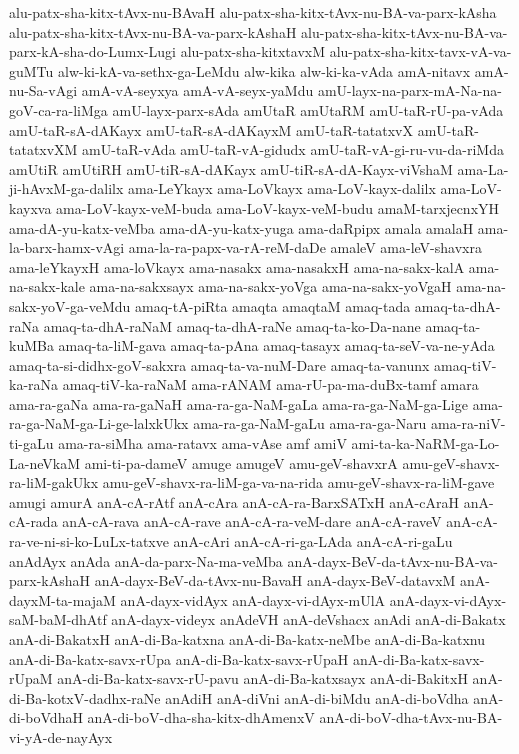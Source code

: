 {alu-patx-sha-kitx-tAvx-nu-BAvaH
alu-patx-sha-kitx-tAvx-nu-BA-va-parx-kAsha
alu-patx-sha-kitx-tAvx-nu-BA-va-parx-kAshaH
alu-patx-sha-kitx-tAvx-nu-BA-va-parx-kA-sha-do-Lumx-Lugi
alu-patx-sha-kitxtavxM
alu-patx-sha-kitx-tavx-vA-va-guMTu
alw-ki-kA-va-sethx-ga-LeMdu
alw-kika
alw-ki-ka-vAda
amA-nitavx
amA-nu-Sa-vAgi
amA-vA-seyxya
amA-vA-seyx-yaMdu
amU-layx-na-parx-mA-Na-na-goV-ca-ra-liMga
amU-layx-parx-sAda
amUtaR
amUtaRM
amU-taR-rU-pa-vAda
amU-taR-sA-dAKayx
amU-taR-sA-dAKayxM
amU-taR-tatatxvX
amU-taR-tatatxvXM
amU-taR-vAda
amU-taR-vA-gidudx
amU-taR-vA-gi-ru-vu-da-riMda
amUtiR
amUtiRH
amU-tiR-sA-dAKayx
amU-tiR-sA-dA-Kayx-viVshaM
ama-La-ji-hAvxM-ga-dalilx
ama-LeYkayx
ama-LoVkayx
ama-LoV-kayx-dalilx
ama-LoV-kayxva
ama-LoV-kayx-veM-buda
ama-LoV-kayx-veM-budu
amaM-tarxjecnxYH
ama-dA-yu-katx-veMba
ama-dA-yu-katx-yuga
ama-daRpipx
amala
amalaH
ama-la-barx-hamx-vAgi
ama-la-ra-papx-va-rA-reM-daDe
amaleV
ama-leV-shavxra
ama-leYkayxH
ama-loVkayx
ama-nasakx
ama-nasakxH
ama-na-sakx-kalA
ama-na-sakx-kale
ama-na-sakxsayx
ama-na-sakx-yoVga
ama-na-sakx-yoVgaH
ama-na-sakx-yoV-ga-veMdu
amaq-tA-piRta
amaqta
amaqtaM
amaq-tada
amaq-ta-dhA-raNa
amaq-ta-dhA-raNaM
amaq-ta-dhA-raNe
amaq-ta-ko-Da-nane
amaq-ta-kuMBa
amaq-ta-liM-gava
amaq-ta-pAna
amaq-tasayx
amaq-ta-seV-va-ne-yAda
amaq-ta-si-didhx-goV-sakxra
amaq-ta-va-nuM-Dare
amaq-ta-vanunx
amaq-tiV-ka-raNa
amaq-tiV-ka-raNaM
ama-rANAM
ama-rU-pa-ma-duBx-tamf
amara
ama-ra-gaNa
ama-ra-gaNaH
ama-ra-ga-NaM-gaLa
ama-ra-ga-NaM-ga-Lige
ama-ra-ga-NaM-ga-Li-ge-lalxkUkx
ama-ra-ga-NaM-gaLu
ama-ra-ga-Naru
ama-ra-niV-ti-gaLu
ama-ra-siMha
ama-ratavx
ama-vAse
amf
amiV
ami-ta-ka-NaRM-ga-Lo-La-neVkaM
ami-ti-pa-dameV
amuge
amugeV
amu-geV-shavxrA
amu-geV-shavx-ra-liM-gakUkx
amu-geV-shavx-ra-liM-ga-va-na-rida
amu-geV-shavx-ra-liM-gave
amugi
amurA
anA-cA-rAtf
anA-cAra
anA-cA-ra-BarxSATxH
anA-cAraH
anA-cA-rada
anA-cA-rava
anA-cA-rave
anA-cA-ra-veM-dare
anA-cA-raveV
anA-cA-ra-ve-ni-si-ko-LuLx-tatxve
anA-cAri
anA-cA-ri-ga-LAda
anA-cA-ri-gaLu
anAdAyx
anAda
anA-da-parx-Na-ma-veMba
anA-dayx-BeV-da-tAvx-nu-BA-va-parx-kAshaH
anA-dayx-BeV-da-tAvx-nu-BavaH
anA-dayx-BeV-datavxM
anA-dayxM-ta-majaM
anA-dayx-vidAyx
anA-dayx-vi-dAyx-mUlA
anA-dayx-vi-dAyx-saM-baM-dhAtf
anA-dayx-videyx
anAdeVH
anA-deVshacx
anAdi
anA-di-Bakatx
anA-di-BakatxH
anA-di-Ba-katxna
anA-di-Ba-katx-neMbe
anA-di-Ba-katxnu
anA-di-Ba-katx-savx-rUpa
anA-di-Ba-katx-savx-rUpaH
anA-di-Ba-katx-savx-rUpaM
anA-di-Ba-katx-savx-rU-pavu
anA-di-Ba-katxsayx
anA-di-BakitxH
anA-di-Ba-kotxV-dadhx-raNe
anAdiH
anA-diVni
anA-di-biMdu
anA-di-boVdha
anA-di-boVdhaH
anA-di-boV-dha-sha-kitx-dhAmenxV
anA-di-boV-dha-tAvx-nu-BA-vi-yA-de-nayAyx
}
